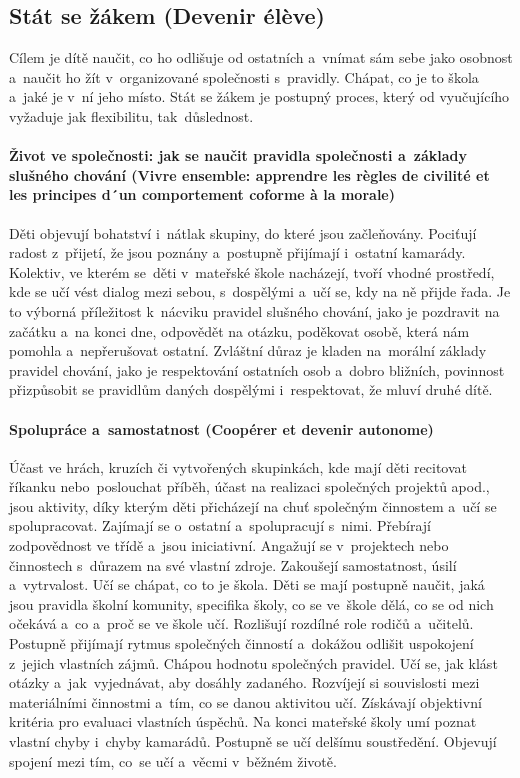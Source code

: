 		\subsection{Stát se žákem (Devenir élève)}
			Cílem je dítě naučit, co ho odlišuje od ostatních a~vnímat sám sebe jako osobnost a~naučit ho žít v organizované společnosti s pravidly. Chápat, co je to škola a~jaké je v ní jeho místo. Stát se žákem je postupný proces, který od vyučujícího vyžaduje jak flexibilitu, tak důslednost.
			\paragraph{Život ve společnosti: jak se naučit pravidla společnosti a~základy slušného chování (Vivre ensemble: apprendre les règles de civilité et les principes d´un comportement coforme à la morale)}
				Děti objevují bohatství i~nátlak skupiny, do které jsou začleňovány. Pociťují radost z přijetí, že jsou poznány a~postupně přijímají i~ostatní kamarády. Kolektiv, ve kterém se děti v mateřské škole nacházejí, tvoří vhodné prostředí, kde se učí vést dialog mezi sebou, s dospělými a~učí se, kdy na ně přijde řada. Je to výborná příležitost k nácviku pravidel slušného chování, jako je pozdravit na začátku a~na konci dne, odpovědět na otázku, poděkovat osobě, která nám pomohla a~nepřerušovat ostatní. Zvláštní důraz je kladen na morální základy pravidel chování, jako je respektování ostatních osob a~dobro bližních, povinnost přizpůsobit se pravidlům daných dospělými i~respektovat, že mluví druhé dítě. 

			\paragraph{Spolupráce a~samostatnost (Coopérer et devenir autonome)}
				Účast ve hrách, kruzích či vytvořených skupinkách, kde mají děti recitovat říkanku nebo poslouchat příběh, účast na realizaci společných projektů apod., jsou aktivity, díky kterým děti přicházejí na chuť společným činnostem a~učí se spolupracovat. Zajímají se o~ostatní a spolupracují s nimi. Přebírají zodpovědnost ve třídě a~jsou iniciativní. Angažují se v projektech nebo činnostech s důrazem na své vlastní zdroje. Zakoušejí samostatnost, úsilí a~vytrvalost. Učí se chápat, co to je škola.
				Děti se mají postupně naučit, jaká jsou pravidla školní komunity, specifika školy, co se ve škole dělá, co se od nich očekává a~co a~proč se ve škole učí. Rozlišují rozdílné role rodičů a~učitelů. 
				Postupně přijímají rytmus společných činností a~dokážou odlišit uspokojení z jejich vlastních zájmů. Chápou hodnotu společných pravidel. Učí se, jak klást otázky a jak vyjednávat, aby dosáhly zadaného. Rozvíjejí si souvislosti mezi materiálními činnostmi a~tím, co se danou aktivitou učí. Získávají objektivní kritéria pro evaluaci vlastních úspěchů. Na konci mateřské školy umí poznat vlastní chyby i~chyby kamarádů. Postupně se učí delšímu soustředění. Objevují spojení mezi tím, co se učí a~věcmi v běžném životě.
